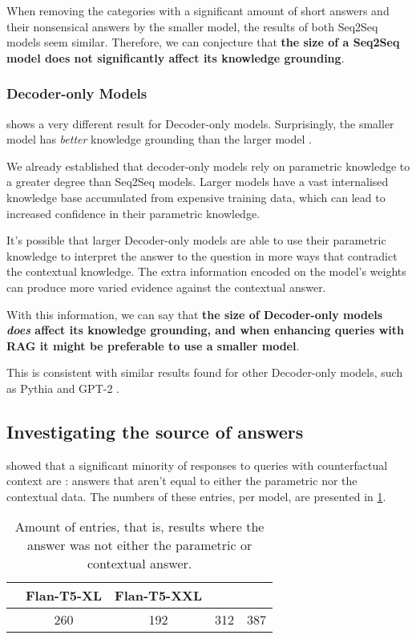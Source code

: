 When removing the categories with a significant amount of short answers and their nonsensical answers by the smaller model, the results of both Seq2Seq models seem similar.
Therefore, we can conjecture that \textbf{the size of a Seq2Seq model does not significantly affect its knowledge grounding}.

\subsubsection{Decoder-only Models}

 shows a very different result for Decoder-only models.
Surprisingly, the smaller model \smallllama{} has \textit{better} knowledge grounding than the larger model \bigllama{}.

We already established that decoder-only models rely on parametric knowledge to a greater degree than Seq2Seq models.
Larger models have a vast internalised knowledge base accumulated from expensive training data, which can lead to increased confidence in their parametric knowledge.

It's possible that larger Decoder-only models are able to use their parametric knowledge to interpret the answer to the question in more ways that contradict the contextual knowledge.
The extra information encoded on the model's weights can produce more varied evidence against the contextual answer.

With this information, we can say that \textbf{the size of Decoder-only models \textit{does} affect its knowledge grounding, and when enhancing queries with RAG it might be preferable to use a smaller model}.

This is consistent with similar results found for other Decoder-only models, such as Pythia and GPT-2 \citep{factual_recall}.

\subsection{Investigating the source of \Other{} answers}
\label{what_are_all_these_others}

 showed that a significant minority of responses to queries with counterfactual context are \Other{}: answers that aren't equal to either the parametric nor the contextual data.
The numbers of these entries, per model, are presented in \cref{others_list}.

\begin{table}[h]
	\centering
	\scriptsize
	\begin{tabular}{>{\bfseries}l | c c c c}
		\toprule
			& \ttfamily\scriptsize Flan-T5-XL & \ttfamily\scriptsize Flan-T5-XXL & \ttfamily\scriptsize \llamaparbox{} & \ttfamily\scriptsize \bigllamaparbox{} \\
		\midrule
			\Other{} & 260 & 192 & 312 & 387 \\
		\bottomrule
	\end{tabular}
	\caption{Amount of \Other{} entries, that is, results where the answer was not either the parametric or contextual answer.}
	\label{others_list}
\end{table}

